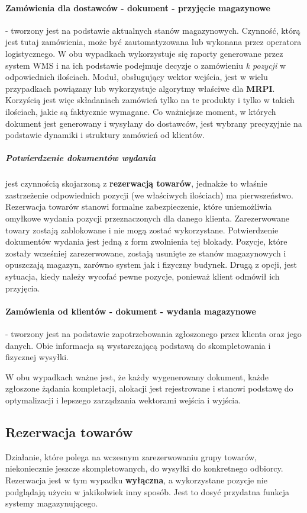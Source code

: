 		\paragraph{Zamówienia dla dostawców - dokument  - przyjęcie magazynowe} - tworzony jest na podstawie
		aktualnych stanów magazynowych. Czynność, którą jest tutaj zamówienia, może być zautomatyzowana lub wykonana
		przez operatora logistycznego. W obu wypadkach wykorzystuje się raporty generowane przez system WMS i 
		na ich podstawie podejmuje decyzje o zamówieniu \textit{k pozycji} w odpowiednich ilościach. Moduł, obsługujący
		wektor wejścia, jest w wielu przypadkach powiązany lub wykorzystuje algorytmy właściwe dla \textbf{MRPI}. 
		Korzyścią jest więc składaniach zamówień tylko na te produkty i tylko w takich ilościach, jakie są faktycznie wymagane.
		Co ważniejsze moment, w których dokument jest generowany i wysyłany do dostawców, jest wybrany precyzyjnie na
		podstawie dynamiki i struktury zamówień od klientów.
			\subparagraph{Potwierdzenie dokumentów wydania} jest czynnością skojarzoną z \textbf{rezerwacją towarów},
			jednakże to właśnie zastrzeżenie odpowiednich pozycji (we właściwych ilościach) ma pierwszeństwo. 
			Rezerwacja towarów stanowi formalne zabezpieczenie, które uniemożliwia omyłkowe wydania 
			pozycji przeznaczonych dla danego klienta. Zarezerwowane towary zostają zablokowane i nie mogą 
			zostać wykorzystane.
			Potwierdzenie dokumentów wydania jest jedną z form zwolnienia tej blokady. Pozycje, które zostały
			wcześniej zarezerwowane, zostają usunięte ze stanów magazynowych i opuszczają magazyn, zarówno
			system jak i fizyczny budynek. Drugą z opcji, jest sytuacja, kiedy należy wycofać pewne 
			pozycje, ponieważ klient odmówił ich przyjęcia.  
		\paragraph{Zamówienia od klientów -  dokument  - wydania magazynowe} - tworzony jest na podstawie zapotrzebowania
		zgłoszonego przez klienta oraz jego danych. Obie informacja są wystarczającą podstawą do skompletowania
		i fizycznej wysyłki. 
		
		W obu wypadkach ważne jest, że każdy wygenerowany dokument, każde zgłoszone żądania kompletacji, alokacji
		jest rejestrowane i stanowi podstawę do optymalizacji i lepszego zarządzania wektorami wejścia i wyjścia. 
	\subsection{Rezerwacja towarów}
		Działanie, które polega na wczesnym zarezerwowaniu grupy towarów, niekoniecznie jeszcze skompletowanych,
		do wysyłki do konkretnego odbiorcy. Rezerwacja jest w tym wypadku \textbf{wyłączna}, a wykorzystane
		pozycje nie podglądają użyciu w jakikolwiek inny sposób. Jest to dosyć przydatna funkcja systemy magazynującego.\\
		
